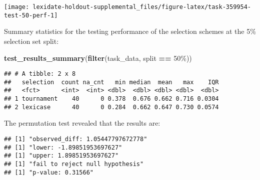 \documentclass[
]{book}
\newenvironment{Shaded}{\begin{snugshade}}{\end{snugshade}}
\newcommand{\AttributeTok}[1]{\textcolor[rgb]{0.13,0.29,0.53}{#1}}
\newcommand{\DecValTok}[1]{\textcolor[rgb]{0.00,0.00,0.81}{#1}}
\newcommand{\FunctionTok}[1]{\textcolor[rgb]{0.13,0.29,0.53}{\textbf{#1}}}
\newcommand{\NormalTok}[1]{#1}
\newcommand{\OtherTok}[1]{\textcolor[rgb]{0.56,0.35,0.01}{#1}}
\newcommand{\SpecialCharTok}[1]{\textcolor[rgb]{0.81,0.36,0.00}{\textbf{#1}}}
\newcommand{\StringTok}[1]{\textcolor[rgb]{0.31,0.60,0.02}{#1}}
\begin{document}
\texttt{[image: lexidate-holdout-supplemental\_files/figure-latex/task-359954-test-50-perf-1]}

Summary statistics for the testing performance of the selection schemes at the 5\% selection set split:

\begin{Shaded}
\begin{Highlighting}[]
\FunctionTok{test\_results\_summary}\NormalTok{(}\FunctionTok{filter}\NormalTok{(task\_data, split }\SpecialCharTok{==} \StringTok{\textquotesingle{}50\%\textquotesingle{}}\NormalTok{))}
\end{Highlighting}
\end{Shaded}

\begin{verbatim}
## # A tibble: 2 x 8
##   selection  count na_cnt   min median  mean   max    IQR
##   <fct>      <int>  <int> <dbl>  <dbl> <dbl> <dbl>  <dbl>
## 1 tournament    40      0 0.378  0.676 0.662 0.716 0.0304
## 2 lexicase      40      0 0.284  0.662 0.647 0.730 0.0574
\end{verbatim}

The permutation test revealed that the results are:

\begin{Shaded}
\end{Shaded}

\begin{verbatim}
## [1] "observed_diff: 1.05447797672778"
## [1] "lower: -1.89851953697627"
## [1] "upper: 1.89851953697627"
## [1] "fail to reject null hypothesis"
## [1] "p-value: 0.31566"
\end{verbatim}
\end{document}
